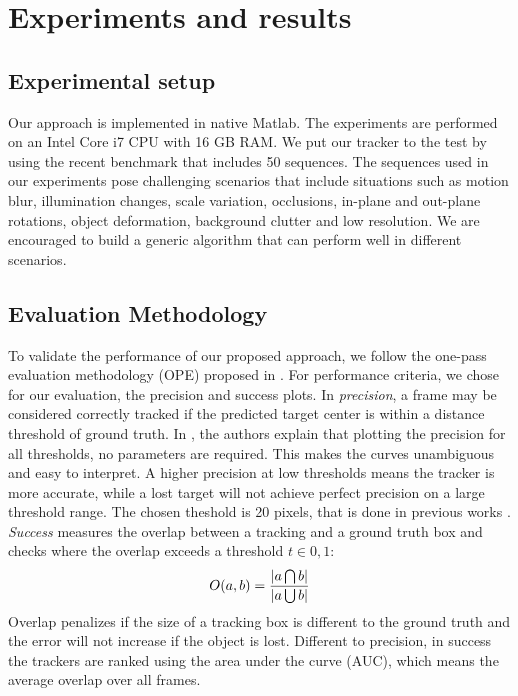 \chapter{Experiments and results} %

\label{chapter5} %


\section{Experimental setup}
Our approach is implemented in native Matlab. The experiments are performed on an Intel Core i7 CPU with 16 GB RAM. We put our tracker to the test by using the recent benchmark \cite{Wu2013} that includes 50 sequences. The sequences used in our experiments pose challenging scenarios that include situations such as motion blur, illumination changes, scale variation, occlusions, in-plane and out-plane rotations, object deformation, background clutter and low resolution. We are encouraged to build a generic algorithm that can perform well in different scenarios.


\section{Evaluation Methodology}

To validate the performance of our proposed approach, we follow the one-pass evaluation methodology (OPE) proposed in \cite{Wu2013}. For performance criteria, we chose for our evaluation, the precision and success plots. In \textit{precision}, a frame may be considered correctly tracked if the predicted target center is within a distance threshold of ground truth. In \cite{Henriques2014}, the authors explain that plotting the precision for all thresholds, no parameters are required. This makes the curves unambiguous and easy to interpret. A higher precision at low thresholds means the tracker is more accurate, while a lost target will not achieve perfect precision on a large threshold range. The chosen theshold is 20 pixels, that is done in previous works \cite{Babenko2010, Wu2013, Henriques2014}. \textit{Success} measures the overlap between a tracking and a ground truth box and checks where the overlap exceeds a threshold $t \in {0,1}$:
\begin{equation}
\large
O(a,b) = \frac{|a\bigcap b|}{|a\bigcup  b|}
\end{equation}
Overlap penalizes if the size of a tracking box is different to the ground truth and the error will not increase if the object is lost. Different to precision, in success the trackers are ranked using the area under the curve (AUC), which means the average overlap over all frames.

